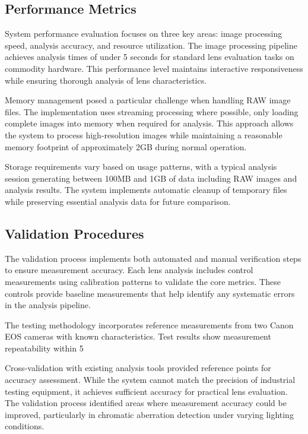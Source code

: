 \subsection{Performance Metrics}
System performance evaluation focuses on three key areas: image processing speed, analysis accuracy, and resource utilization. The image processing pipeline achieves analysis times of under 5 seconds for standard lens evaluation tasks on commodity hardware. This performance level maintains interactive responsiveness while ensuring thorough analysis of lens characteristics.

Memory management posed a particular challenge when handling RAW image files. The implementation uses streaming processing where possible, only loading complete images into memory when required for analysis. This approach allows the system to process high-resolution images while maintaining a reasonable memory footprint of approximately 2GB during normal operation.

Storage requirements vary based on usage patterns, with a typical analysis session generating between 100MB and 1GB of data including RAW images and analysis results. The system implements automatic cleanup of temporary files while preserving essential analysis data for future comparison.

\subsection{Validation Procedures} 
The validation process implements both automated and manual verification steps to ensure measurement accuracy. Each lens analysis includes control measurements using calibration patterns to validate the core metrics. These controls provide baseline measurements that help identify any systematic errors in the analysis pipeline.

The testing methodology incorporates reference measurements from two Canon EOS cameras with known characteristics. Test results show measurement repeatability within 5%

Cross-validation with existing analysis tools provided reference points for accuracy assessment. While the system cannot match the precision of industrial testing equipment, it achieves sufficient accuracy for practical lens evaluation. The validation process identified areas where measurement accuracy could be improved, particularly in chromatic aberration detection under varying lighting conditions.

